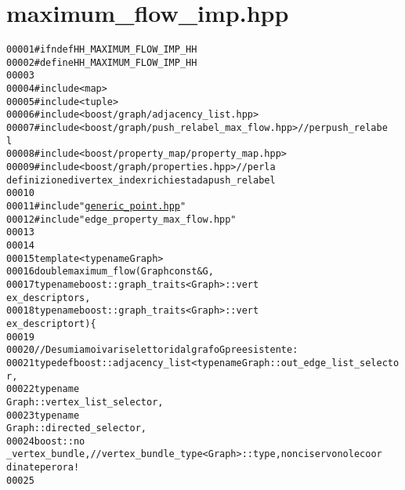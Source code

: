 \hypertarget{maximum__flow__imp_8hpp_source}{
\section{maximum\_\-flow\_\-imp.hpp}
}


\begin{footnotesize}\begin{alltt}
00001 \textcolor{preprocessor}{#ifndef HH\_MAXIMUM\_FLOW\_IMP\_HH}
00002 \textcolor{preprocessor}{}\textcolor{preprocessor}{#define HH\_MAXIMUM\_FLOW\_IMP\_HH}
00003 \textcolor{preprocessor}{}
00004 \textcolor{preprocessor}{#include <map>}
00005 \textcolor{preprocessor}{#include <tuple>}
00006 \textcolor{preprocessor}{#include <boost/graph/adjacency\_list.hpp>}
00007 \textcolor{preprocessor}{#include <boost/graph/push\_relabel\_max\_flow.hpp>}                \textcolor{comment}{//per push\_relabe
      l}
00008 \textcolor{preprocessor}{#include <boost/property\_map/property\_map.hpp>}
00009 \textcolor{preprocessor}{#include <boost/graph/properties.hpp>}                                   \textcolor{comment}{//per la 
      definizione di vertex\_index richiesta da push\_relabel}
00010 
00011 \textcolor{preprocessor}{#include "\hyperlink{generic__point_8hpp}{generic_point.hpp}"}
00012 \textcolor{preprocessor}{#include "edge\_property\_max\_flow.hpp"}
00013 
00014 
00015 \textcolor{keyword}{template}<\textcolor{keyword}{typename} Graph>
00016 \textcolor{keywordtype}{double} maximum\_flow     (Graph \textcolor{keyword}{const} &G, 
00017                                         \textcolor{keyword}{typename} boost::graph\_traits<Graph>::vert
      ex\_descriptor s,
00018                                         \textcolor{keyword}{typename} boost::graph\_traits<Graph>::vert
      ex\_descriptor t)\{
00019         
00020         \textcolor{comment}{//Desumiamo i vari selettori dal grafo G preesistente:}
00021         \textcolor{keyword}{typedef} boost::adjacency\_list   <\textcolor{keyword}{typename} Graph::out\_edge\_list\_selector,
00022                                                                         \textcolor{keyword}{typename} 
      Graph::vertex\_list\_selector,
00023                                                                         \textcolor{keyword}{typename} 
      Graph::directed\_selector,
00024                                                                         boost::no
      \_vertex\_bundle,         \textcolor{comment}{//vertex\_bundle\_type<Graph>::type, non ci servono le coor
      dinate per ora!}
00025                                                                         

\end{alltt}
\end{footnotesize}
